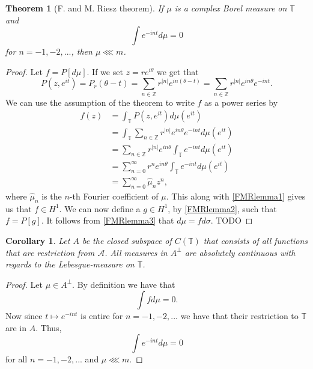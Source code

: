 \documentclass[a4paper,12pt,twoside,BCOR=10mm]{scrbook}
\newtheorem{theorem}{Theorem}
\newtheorem{corollary}{Corollary}
\begin{document}
\begin{theorem}[F. and M. Riesz theorem]
If $\mu$ is a complex Borel measure on $\mathbb{T}$ and
\[
	\int e^{-int} d\mu = 0
\]
for $n = -1, -2, ...$, then $\mu \lll m$.
\end{theorem}
\begin{proof}
Let $f = P[d\mu]$.
If we set $z = re^{i\theta}$ we get that
\[
	P(z, e^{it})
		= P_r(\theta - t)
		= \sum_{n \in \mathbb{Z}} r^{|n|}e^{in(\theta - t)}
		= \sum_{n \in \mathbb{Z}} r^{|n|}e^{in\theta}e^{-int}.
\]
We can use the assumption of the theorem to write $f$ as a power series by
\begin{align*}
	f(z) 
		&= \int_{\mathbb{T}} P(z, e^{it}) d\mu(e^{it}) \\
		&= \int_{\mathbb{T}} \sum_{n \in \mathbb{Z}} r^{|n|}e^{in\theta}e^{-int} d\mu(e^{it}) \\
		&= \sum_{n \in \mathbb{Z}} r^{|n|}e^{in\theta} \int_{\mathbb{T}} e^{-int} d\mu(e^{it}) \\
		&= \sum_{n = 0}^{\infty} r^n e^{in\theta} \int_{\mathbb{T}} e^{-int} d\mu(e^{it}) \\
		&= \sum_{n = 0}^{\infty} \hat{\mu}_n z^n,
\end{align*}
where $\hat{\mu}_n$ is the $n$-th Fourier coefficient of $\mu$.
This along with \ref{FMRlemma1} gives us that $f \in H^1$. %
We can now define a $g \in H^1$, by \ref{FMRlemma2}, such that $f = P[g]$.
It follows from \ref{FMRlemma3} that $d\mu = f d\sigma$. %
TODO
\end{proof}
\begin{corollary}
Let $A$ be the closed subspace of $C(\mathbb{T})$ that consists of all functions that are restriction from $\mathcal{A}$. %
All measures in $A^{\bot}$ are absolutely continuous with regards to the Lebesgue-measure on $\mathbb{T}$. %
\end{corollary}
\begin{proof}
Let $\mu \in A^{\bot}$. By definition we have that
\[
	\int fd\mu = 0.
\]
Now since $t \mapsto e^{-int}$ is entire for $n = -1, -2, ...$ we have that their restriction to $\mathbb{T}$ are in $A$.
Thus,
\[
	\int e^{-int} d\mu = 0
\]
for all $n = -1, -2, ...$ and $\mu \lll m$.
\end{proof}
\end{document}
